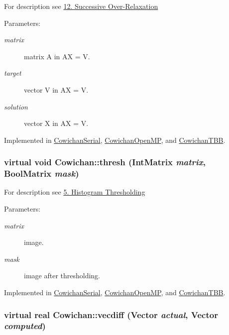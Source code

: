 For description see \hyperlink{index_sor_sec}{12. Successive Over-Relaxation} \begin{Desc}
\item[Parameters:]
\begin{description}
\item[{\em matrix}]matrix A in AX = V. \item[{\em target}]vector V in AX = V. \item[{\em solution}]vector X in AX = V. \end{description}
\end{Desc}


Implemented in \hyperlink{class_cowichan_serial_6e8b06711d976de1adc1e4dc81e560e5}{CowichanSerial}, \hyperlink{class_cowichan_open_m_p_d6482d0369a26a51ef0e37ab238fc664}{CowichanOpenMP}, and \hyperlink{class_cowichan_t_b_b_dbb32ce457d0edca6815ab1cb2459276}{CowichanTBB}.\hypertarget{class_cowichan_a0b633b8c1f21884e0998a9c7020c08c}{
\subsubsection[{thresh}]{\setlength{\rightskip}{0pt plus 5cm}virtual void Cowichan::thresh ({\bf IntMatrix} {\em matrix}, \/  {\bf BoolMatrix} {\em mask})}}
\label{class_cowichan_a0b633b8c1f21884e0998a9c7020c08c}


For description see \hyperlink{index_thresh_sec}{5. Histogram Thresholding} \begin{Desc}
\item[Parameters:]
\begin{description}
\item[{\em matrix}]image. \item[{\em mask}]image after thresholding. \end{description}
\end{Desc}


Implemented in \hyperlink{class_cowichan_serial_7c0f93b2099ce919f91b5d953ff76511}{CowichanSerial}, \hyperlink{class_cowichan_open_m_p_e72c4c0a162f30eac37333bd28db97bc}{CowichanOpenMP}, and \hyperlink{class_cowichan_t_b_b_3306d21f0b3d12cc2e3b050b99812a27}{CowichanTBB}.\hypertarget{class_cowichan_775d72b5e7d122f9f32555352278250e}{
\subsubsection[{vecdiff}]{\setlength{\rightskip}{0pt plus 5cm}virtual {\bf real} Cowichan::vecdiff ({\bf Vector} {\em actual}, \/  {\bf Vector} {\em computed})}}
\label{class_cowichan_775d72b5e7d122f9f32555352278250e}


